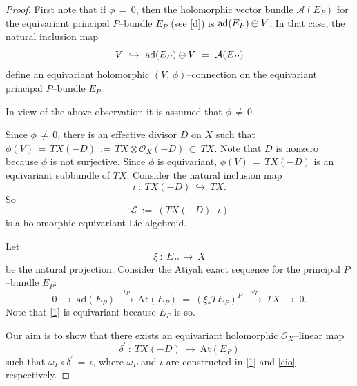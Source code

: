\documentclass[12pt, reqno]{amsart}
\numberwithin{equation}{section}
\newcommand{\ad}{\textrm{ad}}
\newcommand{\At}{\textrm{At}}
\begin{document}
\begin{proof}
First note that if $\phi\,=\,0$, then the holomorphic vector bundle $\mathcal{A}(E_{P})$
for the equivariant principal $P$--bundle $E_P$ (see \eqref{d}) is ${\rm ad}(E_P)\oplus V$. In that case, the
natural inclusion map
$$
V\ \hookrightarrow\ {\rm ad}(E_P)\oplus V\ =\ \mathcal{A}(E_{P})
$$
define an equivariant holomorphic $(V,\,\phi)$--connection on the equivariant principal $P$--bundle $E_P$.

In view of the above observation it is assumed that $\phi\,\not=\, 0$.

Since $\phi\,\not=\, 0$, there is an effective divisor $D$ on $X$ such that $\phi(V)\,=\,TX(-D)\,:=\,
TX\otimes{\mathcal O}_X(-D)\, \subset\, TX$.
Note that $D$ is nonzero because $\phi$ is not surjective.
Since $\phi$ is equivariant, $\phi(V)\,=\,TX(-D)$ is an equivariant subbundle of $TX$. Consider the
natural inclusion map
\begin{equation}\label{eio}
\iota\ :\ TX(-D)\ \hookrightarrow\ TX.
\end{equation}
So
\begin{equation}\label{ei}
\mathcal{L}\ :=\ (TX(-D),\, \iota)
\end{equation}
is a holomorphic equivariant Lie algebroid.

Let
\begin{equation}\label{xi}
\xi\ :\ E_P\ \longrightarrow\ X
\end{equation}
be the natural projection.
Consider the Atiyah exact sequence for the principal $P$--bundle $E_{P}$: 
\begin{equation}\label{1}
0\ \longrightarrow\ \ad(E_{P})\ \xrightarrow{\,\,\,\iota_{P}\,\,\,}\ \At(E_{P})\ =\
(\xi_* TE_P)^P \ \xrightarrow{\,\,\, \omega_{P}\,\,\,}\ TX\ \longrightarrow\ 0.
\end{equation}
Note that \eqref{1} is equivariant because $E_{P}$ is so. 

Our aim is to show that there exists an equivariant holomorphic ${\mathcal O}_X$--linear map
\begin{equation}\label{de}
\delta^{'}\ :\ TX(-D)\ \longrightarrow\ \At(E_{P})
\end{equation}
such that $\omega_{P}\circ\delta^{'}\,=\,\iota$, where $\omega_{P}$ and $\iota$ are constructed
in \eqref{1} and \eqref{eio} respectively. 


\end{proof}
\end{document}
